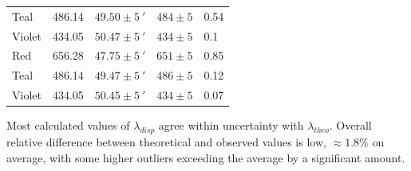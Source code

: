 \documentclass[10pt, twocolumn]{article}
\theoremstyle{definition}
\begin{document}
\begin{table}[ht!]
\begin{tabular}{lllll}
    Teal   & 486.14                                  & $49.50 \pm \qty{5}{\arcminute}$ & $484 \pm 5$                          & 0.54    \\
    Violet & 434.05                                  & $50.47 \pm \qty{5}{\arcminute}$ & $434 \pm 5$                          & 0.1     \\
    \midrule
    Red    & 656.28                                  & $47.75 \pm \qty{5}{\arcminute}$ & $651 \pm 5$                          & 0.85    \\
    Teal   & 486.14                                  & $49.47 \pm \qty{5}{\arcminute}$ & $486 \pm 5$                          & 0.12    \\
    Violet & 434.05                                  & $50.45 \pm \qty{5}{\arcminute}$ & $434 \pm 5$                          & 0.07    \\
    \bottomrule
  \end{tabular}
  \label{t1}
\end{table}
Most calculated values of $\lambda_{disp}$ agree within uncertainty with $\lambda_{theo}$. Overall relative difference between theoretical and observed values is
low, $\approx1.8\%$ on average, with some higher outliers exceeding the average by a significant amount.
\vfill\eject
\end{document}
